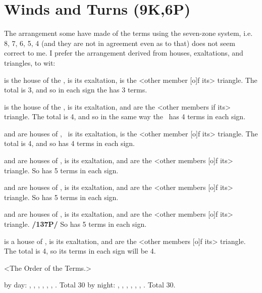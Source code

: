 \section{Winds and Turns (9K,6P)}

The arrangement some have made of the terms using the seven-zone system, i.e. 8, 7, 6, 5, 4 (and they are not in agreement even as to that) does not seem correct to me. I prefer the arrangement derived from houses, exaltations, and triangles, to wit:

\Leo\xspace is the house of the \Sun, \Aries\xspace is its exaltation, \Sagittarius\xspace is the <other member [o]f its> triangle. The total is 3, and so in each sign the \Sun\xspace has 3 terms.

\Cancer\xspace is the house of the \Moon, \Taurus\xspace is its exaltation, \Virgo\xspace and \Capricorn\xspace are the <other members if its> triangle. The total is 4, and so in the same way the \Moon\, has 4 terms in each sign.

\Capricorn\xspace and \Aquarius\xspace are houses of \Saturn, \Libra\, is its exaltation, \Gemini\xspace is the <other member [o]f its> triangle. The total is 4, and so \Saturn\xspace has 4 terms in each sign.

\Sagittarius\xspace and \Pisces\xspace are houses of \Jupiter, \Cancer\xspace is its exaltation, \Aries\xspace and \Leo\xspace are the <other members [o]f its> triangle. So \Jupiter\xspace has 5 terms in each sign.

\Aries\xspace and \Scorpio\xspace are houses of \Mars, \Capricorn\xspace is its exaltation, \Pisces\xspace and \Cancer\xspace are the <other members [o]f its> triangle. So \Mars\xspace has 5 terms in each sign.

\Taurus\xspace and \Libra\xspace are houses of \Venus, \Pisces\xspace is its exaltation, \Virgo\xspace and \Capricorn\xspace are the <other members [o]f its> triangle. \textbf{/137P/} So \Venus\xspace has 5 terms in each sign.

\Gemini\xspace is a house of \Mercury, \Virgo\xspace is its exaltation, \Aquarius\xspace and \Libra\xspace are the <other members [o]f its> triangle. The total is 4, so its terms in each sign will be 4.

<The Order of the Terms.>

\Aries\xspace \Leo\xspace \Sagittarius\xspace by day: , , , , , , . Total 30 by night: , , , , , , . Total 30.

